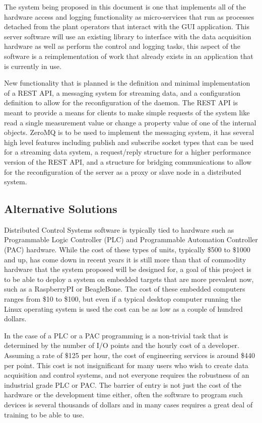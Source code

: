     The system being proposed in this document is one that implements all of
    the hardware access and logging functionality as micro-services that run as
    processes detached from the plant operators that interact with the GUI
    application. This server software will use an existing library to interface
    with the data acquisition hardware as well as perform the control and
    logging tasks, this aspect of the software is a reimplementation of work
    that already exists in an application that is currently in use.

    New functionality that is planned is the definition and minimal
    implementation of a REST API, a messaging system for streaming data, and a
    configuration definition to allow for the reconfiguration of the daemon. The
    REST API is meant to provide a means for clients to make simple requests of
    the system like read a single measurement value or change a property value
    of one of the internal objects. ZeroMQ is to be used to implement the
    messaging system, it has several high level features including publish and
    subscribe socket types that can be used for a streaming data system, a
    request/reply structure for a higher performance version of the REST API,
    and a structure for bridging communications to allow for the reconfiguration
    of the server as a proxy or slave node in a distributed system.

  \subsection{Alternative Solutions}\label{sec:desc-alt}

    Distributed Control Systems software is typically tied to hardware such as
    Programmable Logic Controller (PLC) and Programmable Automation Controller
    (PAC) hardware. While the cost of these types of units, typically \$500 to
    \$1000 and up, has come down in recent years it is still more than that of
    commodity hardware that the system proposed will be designed for, a goal of
    this project is to be able to deploy a system on embedded targets that are
    more prevalent now, such as a RaspberryPI or BeagleBone. The cost of these
    embedded computers ranges from \$10 to \$100, but even if a typical desktop
    computer running the Linux operating system is used the cost can be as low
    as a couple of hundred dollars.

    In the case of a PLC or a PAC programming is a non-trivial task that is
    determined by the number of I/O points and the hourly cost of a developer.
    Assuming a rate of \$125 per hour, the cost of engineering services is
    around \$440 per point\cite{Automation2014}. This cost is not insignificant
    for many users who wish to create data acquisition and control systems, and
    not everyone requires the robustness of an industrial grade PLC or PAC.
    The barrier of entry is not just the cost of the hardware or the
    development time either, often the software to program such devices is
    several thousands of dollars and in many cases requires a great deal of
    training to be able to use.

